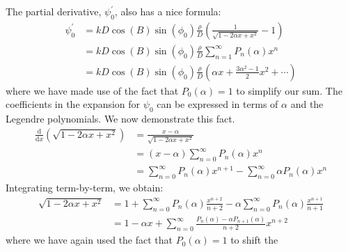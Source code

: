 \documentclass{article}
\begin{document}
        The partial derivative, $\psi^{\prime}_{0}$, also has a nice formula:
        \begin{subequations}
            \begin{align}
                \psi^{\prime}_{0}
                &=kD\cos(B)\sin(\phi_{0})\frac{\rho}{D}\left(
                    \frac{1}{\sqrt{1-2\alpha{x}+x^{2}}}-1
                \right)\\
                &=kD\cos(B)\sin(\phi_{0})\frac{\rho}{D}
                    \sum_{n=1}^{\infty}P_{n}(\alpha)x^{n}\\
                &=kD\cos(B)\sin(\phi_{0})\frac{\rho}{D}\left(
                    \alpha{x}
                    +\frac{3\alpha^{2}-1}{2}x^{2}
                    +\cdots
                \right)
            \end{align}
        \end{subequations}
        where we have made use of the fact that $P_{0}(\alpha)=1$ to simplify
        our sum. The coefficients in the expansion for $\psi_{0}$ can be
        expressed in terms of $\alpha$ and the Legendre polynomials.
        We now demonstrate this fact.
        \begin{subequations}
            \begin{align}
                \frac{\textrm{d}}{\textrm{d}x}\left(
                    \sqrt{1-2\alpha{x}+x^{2}}
                \right)
                &=\frac{x-\alpha}{\sqrt{1-2\alpha{x}+x^{2}}}\\
                &=(x-\alpha)\sum_{n=0}^{\infty}P_{n}(\alpha)x^{n}\\
                &=\sum_{n=0}^{\infty}P_{n}(\alpha)x^{n+1}
                    -\sum_{n=0}^{\infty}\alpha{P}_{n}(\alpha)x^{n}
            \end{align}
        \end{subequations}
        Integrating term-by-term, we obtain:
        \begin{subequations}
            \begin{align}
                \sqrt{1-2\alpha{x}+x^{2}}
                &=1+\sum_{n=0}^{\infty}P_{n}(\alpha)\frac{x^{n+2}}{n+2}
                    -\alpha\sum_{n=0}^{\infty}P_{n}(\alpha)\frac{x^{n+1}}{n+1}\\
                &=1-\alpha{x}+\sum_{n=0}^{\infty}
                    \frac{P_{n}(\alpha)-\alpha{P}_{n+1}(\alpha)}{n+2}x^{n+2}
            \end{align}
        \end{subequations}
        where we have again used the fact that $P_{0}(\alpha)=1$ to shift the
\end{document}
